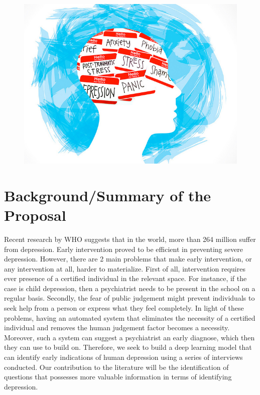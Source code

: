 
\begin{figure}[h!]
\centering
\shorthandoff{=}
\includegraphics[scale=0.5]{paper/depress_detect.jpeg} 
\shorthandoff{=}
\end{figure}

\newpage

\tableofcontents

\newpage




\section{Background/Summary of the Proposal}

Recent research by WHO suggests that in the world, more than 264 million suffer from depression. Early intervention proved to be efficient in preventing severe depression. However, there are 2 main problems that make early intervention, or any intervention at all, harder to materialize. First of all, intervention requires ever presence of a certified individual in the relevant space. For instance, if the case is child depression, then a psychiatrist needs to be present in the school on a regular basis. Secondly, the fear of public judgement might prevent individuals to seek help from a person or express what they feel completely. In light of these problems, having an automated system that eliminates the necessity of a certified individual and removes the human judgement factor becomes a necessity. Moreover, such a system can suggest a psychiatrist an early diagnose, which then they can use to build on. Therefore, we seek to build a deep learning model that can identify early indications of human depression using a series of interviews conducted. Our contribution to the literature will be the identification of questions that possesses more valuable information in terms of identifying depression.  

